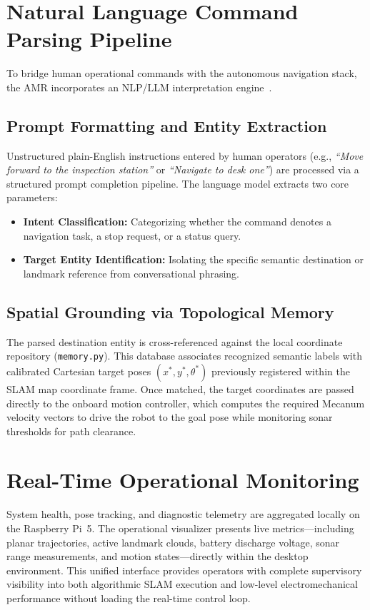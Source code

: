\section{Natural Language Command Parsing Pipeline}
To bridge human operational commands with the autonomous navigation stack, the AMR incorporates an NLP/LLM interpretation engine~\citep{brown2020language, openai2024gpt}.

\subsection{Prompt Formatting and Entity Extraction}
Unstructured plain-English instructions entered by human operators (e.g., \textit{``Move forward to the inspection station''} or \textit{``Navigate to desk one''}) are processed via a structured prompt completion pipeline. The language model extracts two core parameters:
\begin{itemize}
    \item \textbf{Intent Classification:} Categorizing whether the command denotes a navigation task, a stop request, or a status query.
    \item \textbf{Target Entity Identification:} Isolating the specific semantic destination or landmark reference from conversational phrasing.
\end{itemize}

\subsection{Spatial Grounding via Topological Memory}
The parsed destination entity is cross-referenced against the local coordinate repository (\texttt{memory.py}). This database associates recognized semantic labels with calibrated Cartesian target poses $(x^*, y^*, \theta^*)$ previously registered within the SLAM map coordinate frame. Once matched, the target coordinates are passed directly to the onboard motion controller, which computes the required Mecanum velocity vectors to drive the robot to the goal pose while monitoring sonar thresholds for path clearance.

\section{Real-Time Operational Monitoring}
System health, pose tracking, and diagnostic telemetry are aggregated locally on the Raspberry Pi~5. The operational visualizer presents live metrics—including planar trajectories, active landmark clouds, battery discharge voltage, sonar range measurements, and motion states—directly within the desktop environment. This unified interface provides operators with complete supervisory visibility into both algorithmic SLAM execution and low-level electromechanical performance without loading the real-time control loop.